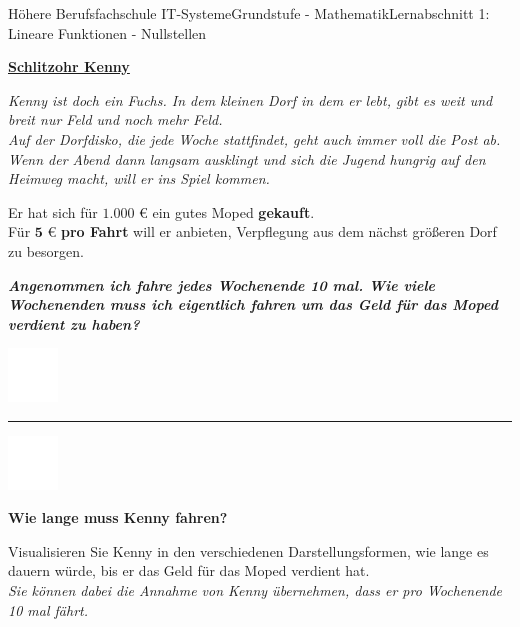 \documentclass[oneside,openany,headings=optiontotoc,11pt,numbers=noenddot]{scrreprt}
\begin{document}
	\begin{worksheet}{Höhere Berufsfachschule IT-Systeme}{Grundstufe - Mathematik}{Lernabschnitt 1: Lineare Funktionen - Nullstellen}
		\noindent
		\begin{framed}
			\noindent
			\Large \textbf{\underline{Schlitzohr Kenny}}\\
			\normalsize
			\par\noindent
			\textit{Kenny ist doch ein Fuchs. In dem kleinen Dorf in dem er lebt, gibt es weit und breit nur Feld und noch mehr Feld.\\
				Auf der Dorfdisko, die jede Woche stattfindet, geht auch immer voll die Post ab. Wenn der Abend dann langsam ausklingt und sich die Jugend hungrig auf den Heimweg macht, will er ins Spiel kommen.}\\
			\par\noindent
			Er hat sich für \(\mathbf{1.000}\) \euro{} ein gutes Moped \textbf{gekauft}.\\
			Für \(\mathbf{5}\) \euro{} \textbf{pro Fahrt} will er anbieten, Verpflegung aus dem nächst größeren Dorf zu besorgen.\\
			\par
			\textit{\glqq{}\textbf{Angenommen ich fahre jedes Wochenende 10 mal. Wie viele Wochenenden muss ich eigentlich fahren um das Geld für das Moped verdient zu haben?}\grqq{}}
		\end{framed}
		\includegraphics[width=0.1\textwidth]{../../empty.jpg}\\
		\rule{\textwidth}{0.1pt}
		\includegraphics[width=0.1\textwidth]{../../empty.jpg}\\
		\begin{framed}
			\Large \textbf{Wie lange muss Kenny fahren?}\\
			\normalsize
			\par\noindent
			Visualisieren Sie Kenny in den verschiedenen Darstellungsformen, wie lange es dauern würde, bis er das Geld für das Moped verdient hat.\\
			\small{\textit{Sie können dabei die Annahme von Kenny übernehmen, dass er pro Wochenende 10 mal fährt.}}
			\begin{itemize}

\end{itemize}
\end{framed}
\end{worksheet}
\end{document}
